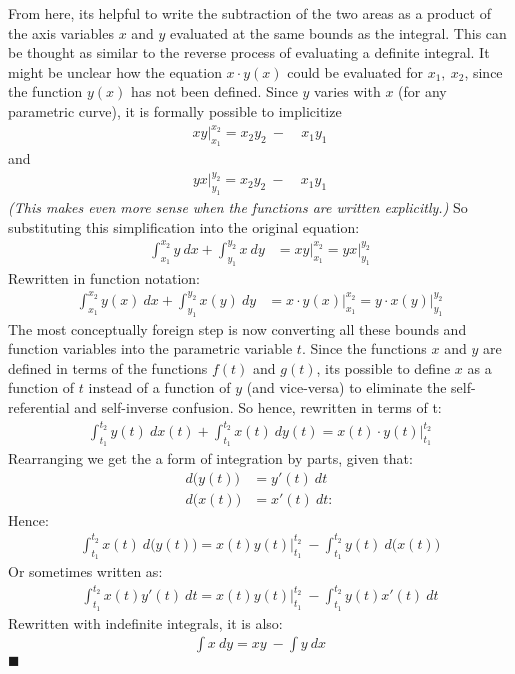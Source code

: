 \documentclass[11pt,a4paper]{article}
\newcommand{\qed}{\hfill $\blacksquare$}
\begin{document}
From here, its helpful to write the subtraction of the two areas as a product of the axis variables $x$ and $y$ evaluated at the same bounds as the integral. This can be thought as similar to the reverse process of evaluating a definite integral. It might be unclear how the equation $x \cdot y(x)$ could be evaluated for $x_1 ,\ x_2$, since the function $y(x)$ has not been defined. Since $y$ varies with $x$ (for any parametric curve), it is formally possible to implicitize 
\begin{align*}
xy \Big|_{x_1}^{x_2} =  x_2 y_2\ -\ & x_1 y_1
\end{align*}
and
\begin{align*}
yx \Big|_{y_1}^{y_2} =  x_2 y_2\ -\ & x_1 y_1
\end{align*}
\textit{(This makes even more sense when the functions are written explicitly.)} So substituting this simplification into the original equation:
\begin{align*}
\int_{x_1}^{x_2} y \ dx + \int_{y_1}^{y_2} x \ dy &= xy \Big|_{x_1}^{x_2} = yx \Big|_{y_1}^{y_2} 
\end{align*}
Rewritten in function notation:
\begin{align*}
\int_{x_1}^{x_2} y(x) \ dx + \int_{y_1}^{y_2} x(y) \ dy &= x \cdot y(x) \Big|_{x_1}^{x_2} = y\cdot x(y) \Big|_{y_1}^{y_2}
\end{align*}
The most conceptually foreign step is now converting all these bounds and function variables into the parametric variable $t$.  Since the functions $x$ and $y$ are defined in terms of the functions $f(t)$ and $g(t)$,  its possible to define $x$ as a function of $t$ instead of a function of $y$ (and vice-versa) to eliminate the self-referential and self-inverse confusion.  So hence, rewritten in terms of t:
\begin{align*}
\int_{t_1}^{t_2} y(t) \ dx(t) + \int_{t_1}^{t_2} x(t) \ dy(t) = x(t)\cdot y(t) \Big|_{t_1}^{t_2} 
\end{align*}
Rearranging we get the a form of integration by parts, given that: \begin{align*}
d\big( y(t) \big) &= y'(t)\ dt \\
d\big(x(t)\big) &= x'(t)\ dt:
\end{align*}
Hence:
\begin{align*}
\int_{t_1}^{t_2} x(t) \ d\big(y(t)\big) = x(t)y(t) \Big|_{t_1}^{t_2} \ - \int_{t_1}^{t_2} y(t) \ d\big(x(t)\big)
\end{align*}
Or sometimes written as:
\begin{align*}
\int_{t_1}^{t_2} x(t)y'(t) \ dt = x(t)y(t) \Big|_{t_1}^{t_2} \ - \int_{t_1}^{t_2} y(t)x'(t)\ dt
\end{align*}
Rewritten with indefinite integrals, it is also:
\begin{align*}
\int x\ dy = xy \ - \int y \ dx 
\end{align*}
\qed
\end{document}
